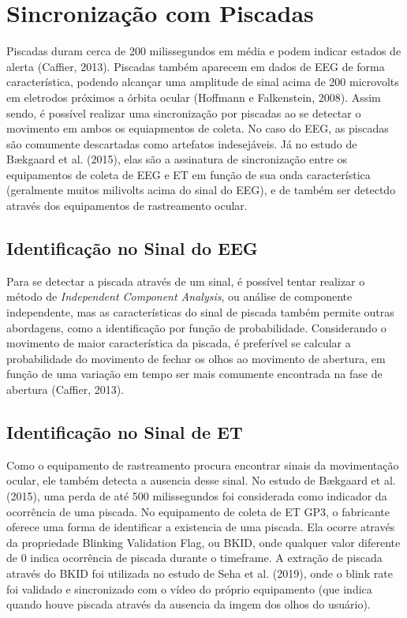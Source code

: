 \section{Sincronização com Piscadas}
Piscadas duram cerca de 200 milissegundos em média e podem indicar estados de alerta (Caffier, 2013). Piscadas também aparecem 
em dados de EEG de forma característica, podendo alcançar uma amplitude de sinal acima de 200 microvolts em eletrodos próximos a órbita ocular (Hoffmann e Falkenstein, 2008). Assim sendo, é possível realizar uma sincronização por piscadas ao se detectar 
o movimento em ambos os equiapmentos de coleta. No caso do EEG, as piscadas são comumente descartadas como artefatos indesejáveis. Já no estudo de 
Bækgaard et al. (2015), elas são a assinatura de sincronização entre os equipamentos de coleta de EEG e ET em função de sua onda característica (geralmente muitos milivolts acima do sinal do EEG), e de também 
ser detectdo através dos equipamentos de rastreamento ocular.

\subsection{Identificação no Sinal do EEG}
Para se detectar a piscada através de um sinal, é possível tentar realizar o método de \textit{Independent Component Analysis}, ou análise de 
componente independente, mas as características do sinal de piscada também permite outras abordagens, como a identificação por função de probabilidade.
Considerando o movimento de maior característica da piscada, é preferível se calcular a probabilidade do movimento de fechar os olhos 
ao movimento de abertura, em função de uma variação em tempo ser mais comumente encontrada na fase de abertura (Caffier, 2013).

\subsection{Identificação no Sinal de ET}
Como o equipamento de rastreamento procura encontrar sinais da movimentação ocular, ele também detecta a ausencia desse sinal. No estudo 
de Bækgaard et al. (2015), uma perda de até 500 milissegundos foi considerada como indicador da ocorrência de uma piscada. No equipamento de coleta de ET GP3, 
o fabricante oferece uma forma de identificar a existencia de uma piscada. Ela ocorre através da propriedade Blinking Validation Flag, ou BKID, onde qualquer 
valor diferente de 0 indica ocorrência de piscada durante o timeframe. A extração de piscada através do BKID foi utilizada no estudo de Seha et al. (2019), 
onde o blink rate foi validado e sincronizado com o vídeo do próprio equipamento (que indica quando houve piscada através da ausencia da imgem dos olhos do usuário).

